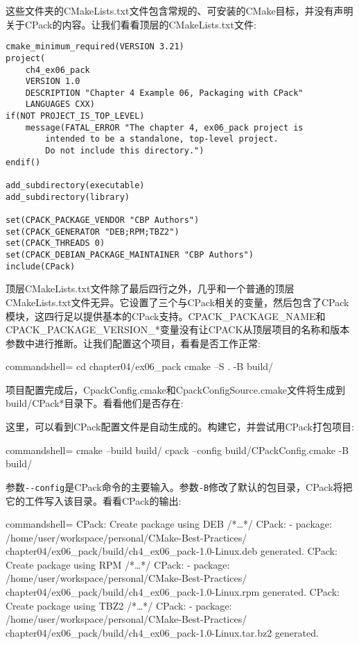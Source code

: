 这些文件夹的CMakeLists.txt文件包含常规的、可安装的CMake目标，并没有声明关于CPack的内容。让我们看看顶层的CMakeLists.txt文件:

\begin{lstlisting}[style=styleCMake]
cmake_minimum_required(VERSION 3.21)
project(
	ch4_ex06_pack
	VERSION 1.0
	DESCRIPTION "Chapter 4 Example 06, Packaging with CPack"
	LANGUAGES CXX)
if(NOT PROJECT_IS_TOP_LEVEL)
	message(FATAL_ERROR "The chapter 4, ex06_pack project is
		intended to be a standalone, top-level project.
		Do not include this directory.")
endif()

add_subdirectory(executable)
add_subdirectory(library)

set(CPACK_PACKAGE_VENDOR "CBP Authors")
set(CPACK_GENERATOR "DEB;RPM;TBZ2")
set(CPACK_THREADS 0)
set(CPACK_DEBIAN_PACKAGE_MAINTAINER "CBP Authors")
include(CPack)
\end{lstlisting}

顶层CMakeLists.txt文件除了最后四行之外，几乎和一个普通的顶层CMakeLists.txt文件无异。它设置了三个与CPack相关的变量，然后包含了CPack模块，这四行足以提供基本的CPack支持。CPACK\_PACKAGE\_NAME和CPACK\_PACKAGE\_VERSION\_*变量没有让CPACK从顶层项目的名称和版本参数中进行推断。让我们配置这个项目，看看是否工作正常:

\begin{tcblisting}{commandshell={}}
cd chapter04/ex06_pack
cmake –S . -B build/
\end{tcblisting}

项目配置完成后，CpackConfig.cmake和CpackConfigSource.cmake文件将生成到build/CPack*目录下。看看他们是否存在:


这里，可以看到CPack配置文件是自动生成的。构建它，并尝试用CPack打包项目:

\begin{tcblisting}{commandshell={}}
cmake --build build/
cpack --config build/CPackConfig.cmake -B build/
\end{tcblisting}

参数\texttt{-{}-config}是CPack命令的主要输入。参数\texttt{-B}修改了默认的包目录，CPack将把它的工件写入该目录。看看CPack的输出:

\begin{tcblisting}{commandshell={}}
CPack: Create package using DEB
/*…*/
CPack: - package: /home/user/workspace/personal/CMake-Best-Practices/
chapter04/ex06_pack/build/ch4_ex06_pack-1.0-Linux.deb
generated.
CPack: Create package using RPM
/*…*/
CPack: - package: /home/user/workspace/personal/CMake-Best-Practices/
chapter04/ex06_pack/build/ch4_ex06_pack-1.0-Linux.rpm
generated.
CPack: Create package using TBZ2
/*…*/
CPack: - package: /home/user/workspace/personal/CMake-Best-Practices/
chapter04/ex06_pack/build/ch4_ex06_pack-1.0-Linux.tar.bz2 
generated.
\end{tcblisting}

